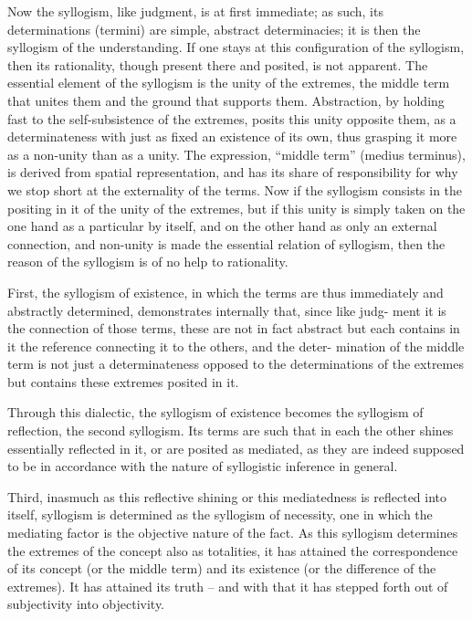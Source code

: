 Now the syllogism, like judgment, is at first immediate; as such, its
determinations (termini) are simple, abstract determinacies; it is then the
syllogism of the understanding. If one stays at this configuration of the
syllogism, then its rationality, though present there and posited, is not
apparent. The essential element of the syllogism is the unity of the extremes,
the middle term that unites them and the ground that supports them.
Abstraction, by holding fast to the self-subsistence of the extremes, posits this
unity opposite them, as a determinateness with just as fixed an existence of its
own, thus grasping it more as a non-unity than as a unity. The expression,
“middle term” (medius terminus), is derived from spatial representation,
and has its share of responsibility for why we stop short at the externality
of the terms. Now if the syllogism consists in the positing in it of the unity
of the extremes, but if this unity is simply taken on the one hand as a
particular by itself, and on the other hand as only an external connection,
and non-unity is made the essential relation of syllogism, then the reason
of the syllogism is of no help to rationality.

First, the syllogism of existence, in which the terms are thus immediately
and abstractly determined, demonstrates internally that, since like judg-
ment it is the connection of those terms, these are not in fact abstract but
each contains in it the reference connecting it to the others, and the deter-
mination of the middle term is not just a determinateness opposed to the
determinations of the extremes but contains these extremes posited in it.

Through this dialectic, the syllogism of existence becomes the syllogism
of reflection, the second syllogism. Its terms are such that in each the other
shines essentially reflected in it, or are posited as mediated, as they are indeed
supposed to be in accordance with the nature of syllogistic inference in
general.

Third, inasmuch as this reflective shining or this mediatedness is reflected
into itself, syllogism is determined as the syllogism of necessity, one in which
the mediating factor is the objective nature of the fact. As this syllogism
determines the extremes of the concept also as totalities, it has attained the
correspondence of its concept (or the middle term) and its existence (or
the difference of the extremes). It has attained its truth – and with that it
has stepped forth out of subjectivity into objectivity.
